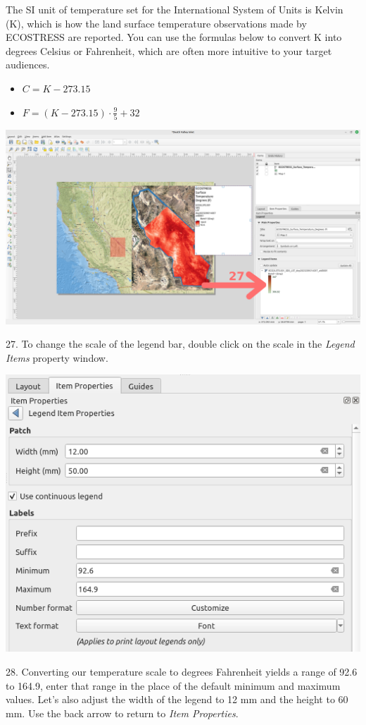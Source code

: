 \documentclass[oneside,a4paper,11pt,explicit]{book}
\begin{document}
The SI unit of temperature set for the International System of Units is Kelvin (K), which is how the land surface temperature observations made by ECOSTRESS are reported. You can use the formulas below to convert K into degrees Celsius or Fahrenheit, which are often more intuitive to your target audiences. 
\begin{itemize}
	\item $C = K - 273.15$
	\item $F = (K - 273.15) \cdot \frac{9}{5} + 32$
\end{itemize}

\centerline{\includegraphics[width=\textwidth]{TempScale1.png}}

27. To change the scale of the legend bar, double click on the scale in the \textit{Legend Items} property window.

\vspace{.25em}

\centerline{\includegraphics[width=.6\textwidth]{TempScale2.png}}

28. Converting our temperature scale to degrees Fahrenheit yields a range of 92.6 to 164.9, enter that range in the place of the default minimum and maximum values. Let's also adjust the width of the legend to 12 mm and the height to 60 mm. Use the back arrow to return to \textit{Item Properties}.
\end{document}
